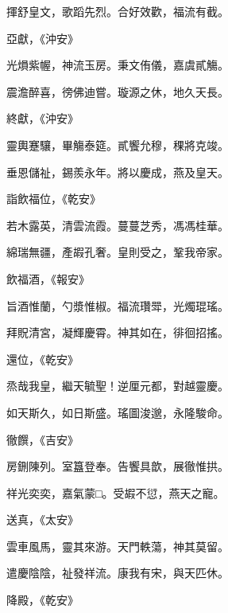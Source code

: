 \begin{pinyinscope}
 揮舒皇文，歌蹈先烈。合好效歡，福流有截。



 亞獻，《沖安》



 光熉紫幄，神流玉房。秉文侑儀，嘉虞貳觴。



 震澹醉喜，徬佛迪嘗。璇源之休，地久天長。



 終獻，《沖安》



 靈輿蹇驤，畢觴泰筵。貳饗允穆，稞將克竣。



 垂恩儲祉，錫羨永年。將以慶成，燕及皇天。



 詣飲福位，《乾安》



 若木露英，清雲流霞。蔓蔓芝秀，馮馮桂華。



 綿瑞無疆，產嘏孔奢。皇則受之，鞏我帝家。



 飲福酒，《報安》



 旨酒惟蘭，勺漿惟椒。福流瓚斝，光燭琨瑤。



 拜貺清宮，凝輝慶霄。神其如在，徘徊招搖。



 還位，《乾安》



 烝哉我皇，繼天毓聖！逆厘元都，對越靈慶。



 如天斯久，如日斯盛。瑤圖浚邈，永隆駿命。



 徹饌，《吉安》



 房鉶陳列。室簋登奉。告饗具歆，展徹惟拱。



 祥光奕奕，嘉氣蒙□。受嘏不愆，燕天之寵。



 送真，《太安》



 雲車風馬，靈其來游。天門軼蕩，神其莫留。



 遣慶陰陰，祉發祥流。康我有宋，與天匹休。



 降殿，《乾安》




\end{pinyinscope}
